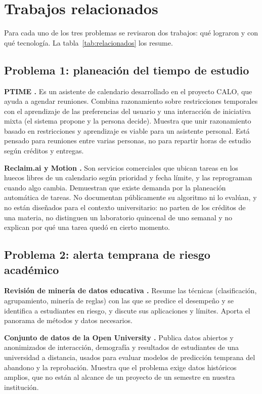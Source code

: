 \section{Trabajos relacionados}\label{sec:trabajos}

Para cada uno de los tres problemas se revisaron dos trabajos: qué lograron y con qué tecnología. La tabla~\ref{tab:relacionados} los resume.

\subsection{Problema 1: planeación del tiempo de estudio}

\textbf{PTIME \parencite{Berry2011}.} Es un asistente de calendario desarrollado en el proyecto CALO, que ayuda a agendar reuniones. Combina razonamiento sobre restricciones temporales con el aprendizaje de las preferencias del usuario y una interacción de iniciativa mixta (el sistema propone y la persona decide). Muestra que unir razonamiento basado en restricciones y aprendizaje es viable para un asistente personal. Está pensado para reuniones entre varias personas, no para repartir horas de estudio según créditos y entregas.

\textbf{Reclaim.ai y Motion \parencite{Reclaim,Motion}.} Son servicios comerciales que ubican tareas en los huecos libres de un calendario según prioridad y fecha límite, y las reprograman cuando algo cambia. Demuestran que existe demanda por la planeación automática de tareas. No documentan públicamente su algoritmo ni lo evalúan, y no están diseñados para el contexto universitario: no parten de los créditos de una materia, no distinguen un laboratorio quincenal de uno semanal y no explican por qué una tarea quedó en cierto momento.

\subsection{Problema 2: alerta temprana de riesgo académico}

\textbf{Revisión de minería de datos educativa \parencite{Romero2020}.} Resume las técnicas (clasificación, agrupamiento, minería de reglas) con las que se predice el desempeño y se identifica a estudiantes en riesgo, y discute sus aplicaciones y límites. Aporta el panorama de métodos y datos necesarios.

\textbf{Conjunto de datos de la Open University \parencite{Kuzilek2017}.} Publica datos abiertos y anonimizados de interacción, demografía y resultados de estudiantes de una universidad a distancia, usados para evaluar modelos de predicción temprana del abandono y la reprobación. Muestra que el problema exige datos históricos amplios, que no están al alcance de un proyecto de un semestre en nuestra institución.

